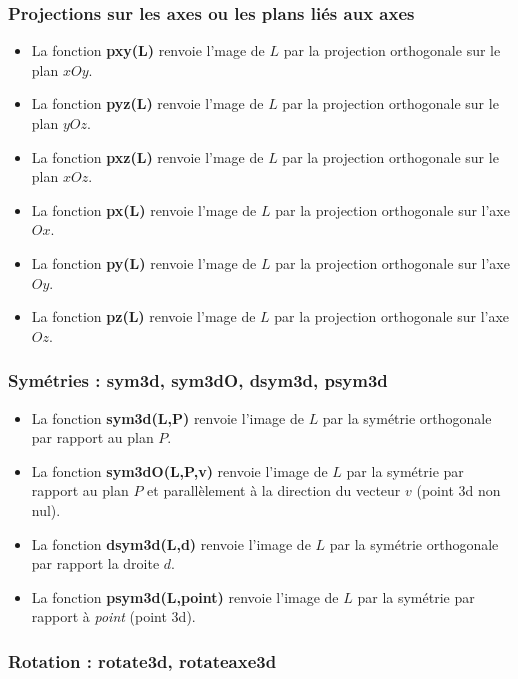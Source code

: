 \subsubsection{Projections sur les axes ou les plans liés aux axes}

\begin{itemize}
    \item La fonction \textbf{pxy(L)} renvoie l'mage de $L$ par la projection orthogonale sur le plan $xOy$.
    \item La fonction \textbf{pyz(L)} renvoie l'mage de $L$ par la projection orthogonale sur le plan $yOz$.
    \item La fonction \textbf{pxz(L)} renvoie l'mage de $L$ par la projection orthogonale sur le plan $xOz$.
\item La fonction \textbf{px(L)} renvoie l'mage de $L$ par la projection orthogonale sur l'axe $Ox$.
\item La fonction \textbf{py(L)} renvoie l'mage de $L$ par la projection orthogonale sur l'axe $Oy$.
\item La fonction \textbf{pz(L)} renvoie l'mage de $L$ par la projection orthogonale sur l'axe $Oz$.
\end{itemize}

\subsubsection{Symétries : sym3d, sym3dO, dsym3d, psym3d}

\begin{itemize}
    \item La fonction \textbf{sym3d(L,P)} renvoie l'image de $L$ par la symétrie orthogonale par rapport au plan $P$.
    \item La fonction \textbf{sym3dO(L,P,v)} renvoie l'image de $L$ par la symétrie par rapport au plan $P$ et parallèlement à la direction du vecteur $v$ (point 3d non nul).
    \item La fonction \textbf{dsym3d(L,d)} renvoie l'image de $L$ par la symétrie orthogonale par rapport la droite $d$.
    \item La fonction \textbf{psym3d(L,point)} renvoie l'image de $L$ par la symétrie par rapport à \emph{point} (point 3d).
\end{itemize}

\subsubsection{Rotation : rotate3d, rotateaxe3d}

